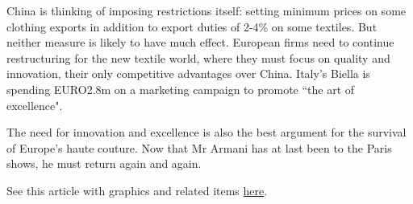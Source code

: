 \documentclass[letterpaper,12pt]{article}
\begin{document}
China is thinking of imposing restrictions itself: setting minimum
prices on some clothing exports in addition to export duties of 2-4\% on
some textiles. But neither measure is likely to have much effect.
European firms need to continue restructuring for the new textile
world, where they must focus on quality and innovation, their only
competitive advantages over China. Italy's Biella is spending
EURO2.8m on a marketing campaign to promote ``the art of
excellence".

The need for innovation and excellence is also the best argument
for the survival of Europe's haute couture. Now that Mr Armani has
at last been to the Paris shows, he must return again and again.

See this article with graphics and related items
\href{http://www.economist.com/displaystory.cfm?story_id=3599862}{here}.
\end{document}
